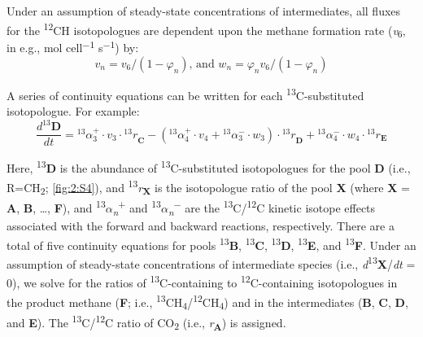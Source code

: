Under an assumption of steady-state concentrations of intermediates, all
fluxes for the \textsuperscript{12}CH isotopologues are dependent upon
the methane formation rate (\emph{v}\textsubscript{6}, in e.g., mol
cell\textsuperscript{$-1$} s\textsuperscript{$-1$}) by:
\begin{equation}\label{eqn:methaneformationrate}
v_n=v_6/(1-\varphi_n ) \text{, and } w_n= \varphi_n v_6/(1-\varphi_n )
\end{equation}

A series of continuity equations can be written for each \textsuperscript{13}C-substituted isotopologue.  For example: 
\begin{equation}\label{eqn:continuityequations}
\frac{d^{13}\mathbf{D}}{dt} = {}_{\ }^{13}\alpha_{3}^{+} \cdot  v_{3} \cdot  {_{\ }^{13}r}_{\mathbf{C}} - \left(_{\ }^{13}\alpha_{4}^{+} \cdot v_{4} + {}_{\ }^{13}\alpha_{3}^{-} \cdot  w_{3} \right) \cdot  {_{\ }^{13}r}_{\mathbf{D}} + {}_{\ }^{13}\alpha_{4}^{-} \cdot  w_{4} \cdot {}_{\ }^{13}r_{\mathbf{E}}
\end{equation}

Here, \textsuperscript{13}\textbf{D} is the abundance of
\textsuperscript{13}C-substituted isotopologues for the pool \textbf{D}
(i.e., R=CH\textsubscript{2}; \autoref{fig:2:S4}), and
\textsuperscript{13}\emph{r}\textbf{\textsubscript{X}} is the
isotopologue ratio of the pool \textbf{X} (where \textbf{X} =
\textbf{A}, \textbf{B}, \ldots{}, \textbf{F}), and
\textsuperscript{13}$\alpha$\emph{\textsubscript{n}}\textsuperscript{+} and
\textsuperscript{13}$\alpha$\emph{\textsubscript{n}}\textsuperscript{$-$} are the
\textsuperscript{13}C/\textsuperscript{12}C kinetic isotope effects
associated with the forward and backward reactions, respectively. There
are a total of five continuity equations for pools
\textsuperscript{13}\textbf{B}, \textsuperscript{13}\textbf{C},
\textsuperscript{13}\textbf{D}, \textsuperscript{13}\textbf{E}, and
\textsuperscript{13}\textbf{F}. Under an assumption of steady-state
concentrations of intermediate species (i.e.,
\emph{d}\textsuperscript{13}\textbf{X}/\emph{dt} = 0), we solve for the
ratios of \textsuperscript{13}C-containing to
\textsuperscript{12}C-containing isotopologues in the product methane
(\textbf{F}; i.e.,
\textsuperscript{13}CH\textsubscript{4}/\textsuperscript{12}CH\textsubscript{4})
and in the intermediates (\textbf{B}, \textbf{C}, \textbf{D}, and
\textbf{E}). The \textsuperscript{13}C/\textsuperscript{12}C ratio of
CO\textsubscript{2} (i.e., \emph{r}\textbf{\textsubscript{A}}) is
assigned.

